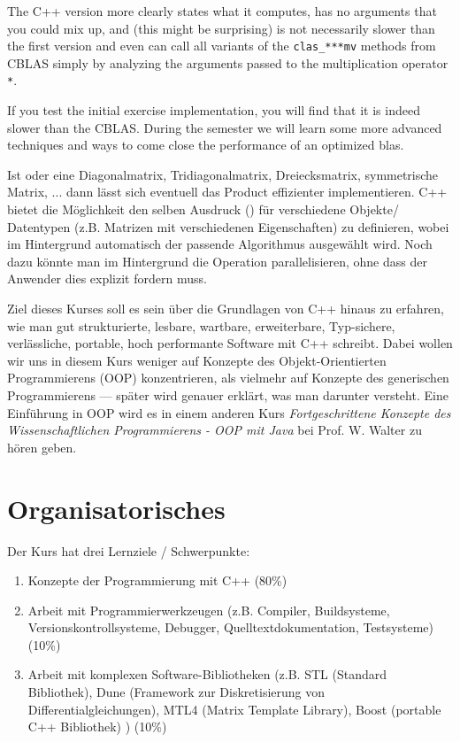 The C++ version more clearly states what it computes, has no arguments that you could mix up, and (this might be
surprising) is not necessarily slower than the first version and even can call all variants of the \texttt{clas\_***mv} methods
from CBLAS simply by analyzing the arguments passed to the multiplication operator \texttt{*}.

\begin{rem}
  If you test the initial exercise implementation, you will find that it is indeed slower than the CBLAS. During the semester
  we will learn some more advanced techniques and ways to come close the performance of an optimized blas.
\end{rem}

\begin{example}
Ist  oder  eine Diagonalmatrix, Tridiagonalmatrix, Dreiecksmatrix, symmetrische Matrix, ... dann lässt sich eventuell das Product  effizienter implementieren. C++ bietet die Möglichkeit den selben Ausdruck () für verschiedene Objekte/ Datentypen (z.B. Matrizen mit verschiedenen Eigenschaften) zu definieren, wobei im Hintergrund automatisch der passende Algorithmus ausgewählt wird. Noch dazu könnte man im Hintergrund die Operation parallelisieren, ohne dass der Anwender dies explizit fordern muss.
\end{example}

Ziel dieses Kurses soll es sein über die Grundlagen von C++ hinaus zu erfahren, wie man gut strukturierte, lesbare, wartbare, erweiterbare, Typ-sichere, verlässliche, portable, hoch performante Software mit C++ schreibt. Dabei wollen wir uns in diesem Kurs weniger auf Konzepte des Objekt-Orientierten Programmierens (OOP) konzentrieren, als vielmehr auf Konzepte des generischen Programmierens --- später wird genauer erklärt, was man darunter versteht. Eine Einführung in OOP wird es in einem anderen Kurs \textit{Fortgeschrittene Konzepte des Wissenschaftlichen Programmierens - OOP mit Java} bei Prof. W. Walter zu hören geben.

\section{Organisatorisches}
Der Kurs hat drei Lernziele / Schwerpunkte:
\begin{enumerate}[1)]
\item Konzepte der Programmierung mit C++ (80\%)
\item Arbeit mit Programmierwerkzeugen (z.B. Compiler, Buildsysteme, Versionskontrollsysteme, Debugger, Quelltextdokumentation, Testsysteme) (10\%)
\item Arbeit mit komplexen Software-Bibliotheken (z.B. STL (Standard Bibliothek), Dune (Framework zur Diskretisierung von Differentialgleichungen), MTL4 (Matrix Template Library), Boost (portable C++ Bibliothek) ) (10\%)
\end{enumerate}

